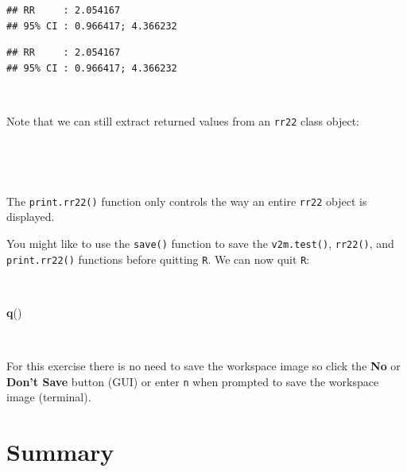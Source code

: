 \documentclass[12pt,a4paper]{book}
\newenvironment{Shaded}{\begin{snugshade}}{\end{snugshade}}
\newcommand{\KeywordTok}[1]{\textcolor[rgb]{0.13,0.29,0.53}{\textbf{#1}}}
\newcommand{\NormalTok}[1]{#1}
\newcommand{\OperatorTok}[1]{\textcolor[rgb]{0.81,0.36,0.00}{\textbf{#1}}}
\theoremstyle{definition}
\theoremstyle{definition}
\theoremstyle{definition}
\theoremstyle{remark}
\begin{document}
\begin{verbatim}
## RR     : 2.054167
## 95% CI : 0.966417; 4.366232
\end{verbatim}

\begin{verbatim}
## RR     : 2.054167
## 95% CI : 0.966417; 4.366232
\end{verbatim}

~

Note that we can still extract returned values from an \texttt{rr22}
class object:

~

\begin{Shaded}
\end{Shaded}

~

The \texttt{print.rr22()} function only controls the way an entire
\texttt{rr22} object is displayed.

You might like to use the \texttt{save()} function to save the
\texttt{v2m.test()}, \texttt{rr22()}, and \texttt{print.rr22()}
functions before quitting \texttt{R}. We can now quit \texttt{R}:

~

\begin{Shaded}
\begin{Highlighting}[]
\KeywordTok{q}\NormalTok{()}
\end{Highlighting}
\end{Shaded}

~

For this exercise there is no need to save the workspace image so click
the \textbf{No} or \textbf{Don't Save} button (GUI) or enter \texttt{n}
when prompted to save the workspace image (terminal).

\hypertarget{summary-5}{%
\section{Summary}\label{summary-5}}
\end{document}
